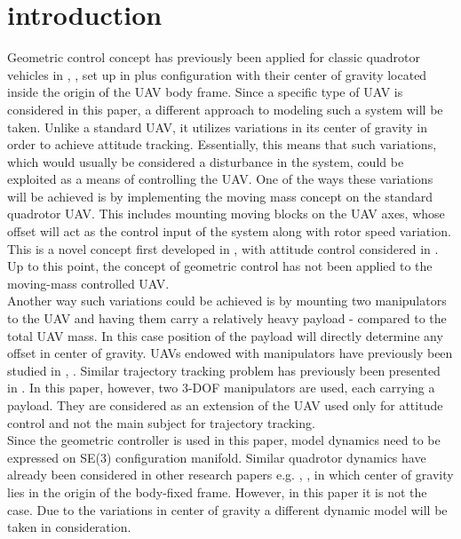 \section{introduction}

Geometric control concept has previously been applied for classic quadrotor vehicles in \cite{LeeClanak4}, \cite{LeeClanak3}, \cite{LeeClanak1} set up in plus configuration with their center of gravity located inside the origin of the UAV body frame. Since a specific type of UAV is considered in this paper, a different approach to modeling such a system will be taken. Unlike a standard UAV, it utilizes variations in its center of gravity in order to achieve attitude tracking. Essentially, this means that such variations, which would usually be considered a disturbance in the system, could be exploited as a means of controlling the UAV. 
One of the ways these variations will be achieved is by implementing the moving mass concept on the standard quadrotor UAV. This includes mounting moving blocks on the UAV axes, whose offset will act as the control input of the system along with rotor speed variation. This is a novel concept first developed in \cite{movingMass1},\cite{movingMass2} with attitude control considered in \cite{movingMass3}. Up to this point, the concept of geometric control has not been applied to the moving-mass controlled UAV.  \\
Another way such variations could be achieved is by mounting two manipulators to the UAV and having them carry a relatively heavy payload - compared to the total UAV mass. In this case position of the payload will directly determine any offset in center of gravity. UAVs endowed with manipulators have previously been studied in \cite{manipulator1}, \cite{manipulator2}. Similar trajectory tracking problem has previously been presented in \cite{manipulator3}. In this paper, however, two 3-DOF manipulators are used, each carrying a payload. They are considered as an extension of the UAV used only for attitude control and not the main subject for trajectory tracking. \\
Since the geometric controller is used in this paper, model dynamics need to be expressed on SE(3) configuration manifold. Similar quadrotor dynamics have already been considered in other research papers e.g. \cite{LeeClanak4}, \cite{LeeClanak2}, \cite{LeeClanak1} in which center of gravity lies in the origin of the body-fixed frame. However, in this paper it is not the case. Due to the variations in center of gravity a different dynamic model will be taken in consideration. \\

